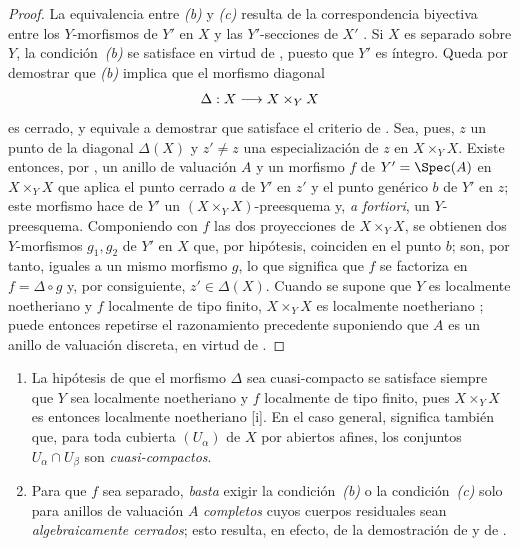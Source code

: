 \documentclass[oneside,10pt]{amsart}
\makeatletter
\newcommand{\ega@arrow}[2]{\mathchoice{#1}{#2}{#2}{#2}}
\renewcommand{\to}{\ega@arrow{\longrightarrow}{\rightarrow}}
\let\EGAOriginalLabel\label
\renewcommand{\label}[1]{\phantomsection\EGAOriginalLabel{#1}}
\makeatother
\begin{document}
\begin{proof}
La equivalencia entre \emph{(b)} y \emph{(c)} resulta de la correspondencia biyectiva entre los $Y$-morfismos de $Y'$ en $X$ y las $Y'$-secciones de $X'$ .
Si $X$ es separado sobre $Y$, la condición~\emph{(b)} se satisface en virtud de , puesto que $Y'$ es íntegro.
Queda por demostrar que \emph{(b)} implica que el morfismo diagonal
\[
  \Delta:X\to X\times_Y X
\]
es cerrado, y equivale a demostrar que satisface el criterio de .
Sea, pues, $z$ un punto de la diagonal $\Delta(X)$ y $z'\neq z$ una especialización de $z$ en $X\times_Y X$.
Existe entonces, por , un anillo de valuación $A$ y un morfismo $f$ de $Y'=\Spec(A)$ en $X\times_Y X$ que aplica el punto cerrado $a$ de $Y'$ en $z'$ y el punto genérico $b$ de $Y'$ en $z$;
este morfismo hace de $Y'$ un $(X\times_Y X)$-preesquema y, \emph{a fortiori}, un $Y$-preesquema.
Componiendo con $f$ las dos proyecciones de $X\times_Y X$, se obtienen dos $Y$-morfismos $g_1,g_2$ de $Y'$ en $X$ que, por hipótesis, coinciden en el punto $b$;
son, por tanto, iguales a un mismo morfismo $g$, lo que significa  que $f$ se factoriza en $f=\Delta\circ g$ y, por consiguiente, $z'\in\Delta(X)$.
Cuando se supone que $Y$ es localmente noetheriano y $f$ localmente de tipo finito, $X\times_Y X$ es localmente noetheriano ;
puede entonces repetirse el razonamiento precedente suponiendo que $A$ es un anillo de valuación discreta, en virtud de .
\end{proof}

\begin{remark}[7.2.4]
\label{II.7.2.4}
\begin{enumerate}
  \item[\rm{(i)}] La hipótesis de que el morfismo $\Delta$ sea cuasi-compacto se satisface siempre que $Y$ sea localmente noetheriano y $f$ localmente de tipo finito, pues $X\times_Y X$ es entonces localmente noetheriano [i].
  En el caso general, significa también que, para toda cubierta $(U_\alpha)$ de $X$ por abiertos afines, los conjuntos $U_\alpha\cap U_\beta$ son \emph{cuasi-compactos}.
  \item[\rm{(ii)}] Para que $f$ sea separado, \emph{basta} exigir la condición~\emph{(b)} o la condición~\emph{(c)} solo para anillos de valuación $A$ \emph{completos} cuyos cuerpos residuales sean \emph{algebraicamente cerrados};
  esto resulta, en efecto, de la demostración de  y de .
\end{enumerate}
\end{remark}
\end{document}
